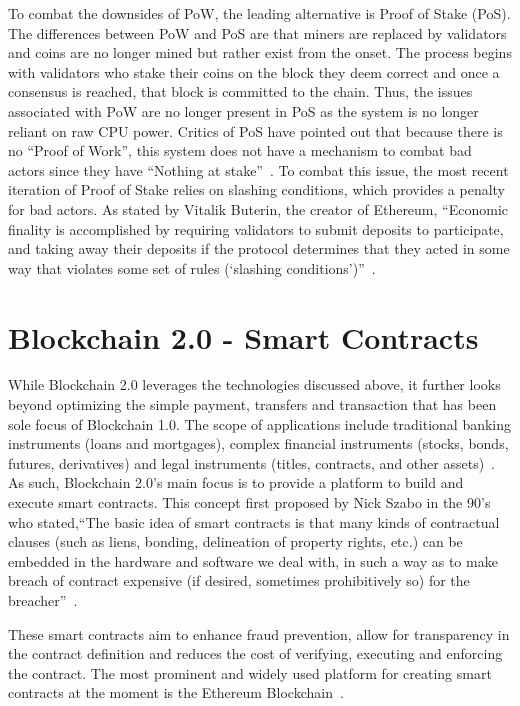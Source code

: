 To combat the downsides of PoW, the leading alternative is Proof of Stake (PoS). The differences between PoW and PoS are that miners are replaced by validators and coins are no longer mined but rather exist from the onset. The process begins with validators who stake their coins on the block they deem correct and once a consensus is reached, that block is committed to the chain. Thus, the issues associated with PoW are no longer present in PoS as the system is no longer reliant on raw CPU power.  Critics of PoS have pointed out that because there is no “Proof of Work”, this system does not have a mechanism to combat bad actors since they have ``Nothing at stake''~\cite{hid-sp18-414-www-pow-vs-pos}. To combat this issue, the most recent iteration of Proof of Stake relies on slashing conditions, which provides a penalty for bad actors. As stated by Vitalik Buterin, the creator of Ethereum, ``Economic finality is accomplished by requiring validators to submit deposits to participate, and taking away their deposits if the protocol determines that they acted in some way that violates some set of rules (‘slashing conditions’)''~\cite{hid-sp18-414-www-pow-vs-pos}.



\section{Blockchain 2.0 - Smart Contracts}

While Blockchain 2.0 leverages the technologies discussed above, it further looks beyond optimizing the simple payment, transfers and transaction that has been sole focus of Blockchain 1.0.  The scope of applications include traditional banking instruments (loans and mortgages), complex financial instruments (stocks, bonds, futures, derivatives) and legal instruments (titles, contracts, and other assets)~\cite{hid-sp18-414-www-promise-bitcoin-blockchain}. As such, Blockchain 2.0’s main focus is to provide a platform to build and execute smart contracts. This concept first proposed by Nick Szabo in the 90’s who stated,``The basic idea of smart contracts is that many kinds of contractual clauses (such as liens, bonding, delineation of property rights, etc.) can be embedded in the hardware and software we deal with, in such a way as to make breach of contract expensive (if desired, sometimes prohibitively so) for the breacher''~\cite{hid-sp18-414-www-blockchain-theory-application}.

These smart contracts aim to enhance fraud prevention, allow for transparency in the contract definition and reduces the cost of verifying, executing and enforcing the contract. The most prominent and widely used platform for creating smart contracts at the moment is the Ethereum Blockchain~\cite{hid-sp18-414-www-blockchain-evolution}.

